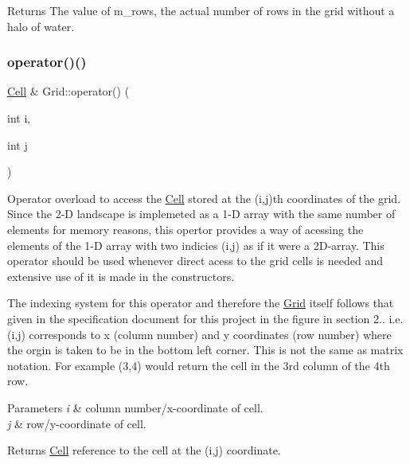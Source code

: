 \begin{DoxyReturn}{Returns}
The value of m\+\_\+rows, the actual number of rows in the grid without a halo of water. 
\end{DoxyReturn}
\mbox{\label{class_grid_aed06be122077b3a0c1fe7c412c2535fc}} 
\subsubsection{\texorpdfstring{operator()()}{operator()()}\hspace{0.1cm}{\footnotesize\ttfamily [1/2]}}
{\footnotesize\ttfamily \hyperlink{class_cell}{Cell} \& Grid\+::operator() (\begin{DoxyParamCaption}\item[{int}]{i,  }\item[{int}]{j }\end{DoxyParamCaption})}

Operator overload to access the \hyperlink{class_cell}{Cell} stored at the (i,j)th coordinates of the grid. Since the 2-\/D landscape is implemeted as a 1-\/D array with the same number of elements for memory reasons, this opertor provides a way of acessing the elements of the 1-\/D array with two indicies (i,j) as if it were a 2\+D-\/array. This operator should be used whenever direct acess to the grid cells is needed and extensive use of it is made in the constructors.

The indexing system for this operator and therefore the \hyperlink{class_grid}{Grid} itself follows that given in the specification document for this project in the figure in section 2.. i.\+e. (i,j) corresponds to x (column number) and y coordinates (row number) where the orgin is taken to be in the bottom left corner. This is not the same as matrix notation. For example (3,4) would return the cell in the 3rd column of the 4th row.


\begin{DoxyParams}{Parameters}
{\em i} & column number/x-\/coordinate of cell. \\
\hline
{\em j} & row/y-\/coordinate of cell.\\
\hline
\end{DoxyParams}
\begin{DoxyReturn}{Returns}
\hyperlink{class_cell}{Cell} reference to the cell at the (i,j) coordinate. 
\end{DoxyReturn}
\mbox{\label{class_grid_aa89f5c17cb78658f3b82a3b2d93aeb92}} 
